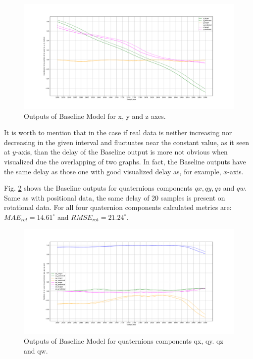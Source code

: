 \begin{figure}[htb]
	\begin{center}
		\includegraphics[width=1\textwidth, keepaspectratio]{gfx/base_zoom-xyz_position.pdf}
		\caption{\label{fig:base_xyz} Outputs of Baseline Model for x, y and z axes.}
	\end{center}
\end{figure}

It is worth to mention that in the case if real data is neither increasing nor decreasing in the given interval and fluctuates near the constant value, as it seen at $y$-axis, than the delay of the Baseline output is more not obvious when visualized due the overlapping of two graphs. In fact, the Baseline outputs have the same delay as those one with good visualized delay as, for example, $x$-axis.

Fig. \ref{fig:base_quat_xyzw} shows the Baseline outputs for quaternions components $qx, qy, qz$ and $qw$. Same as with positional data, the same delay of 20 samples is present on rotational data. For all four quaternion components calculated metrics  are: $MAE_{rot} = 14.61^{\circ}$ and $RMSE_{rot} =21.24^{\circ}$.  

\begin{figure}[htb]
	\begin{center}
		\includegraphics[width=1\textwidth, keepaspectratio]{gfx/base_zoom-qx_qy_qz_qw_rotation.pdf}
		\caption{\label{fig:base_quat_xyzw} Outputs of Baseline Model for quaternions components qx, qy. qz and qw.}
	\end{center}
\end{figure}

